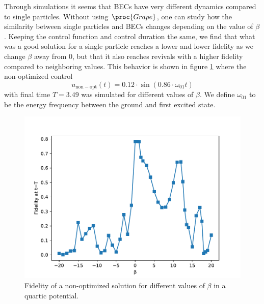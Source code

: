 \documentclass[a4paper, twocolumn]{revtex4-1}
\begin{document}
Through simulations it seems that BECs have very different dynamics compared to single particles. Without using $\proc{Grape}$, one can study how the similarity between single particles and BECs changes depending on the value of $\beta$. Keeping the control function and control duration the same, we find that what was a good solution for a single particle reaches a lower and lower fidelity as we change $\beta$ away from 0, but that it also reaches revivals with a higher fidelity compared to neighboring values. This behavior is shown in figure \ref{fig:beta} where the non-optimized control
\begin{equation}
	u_{\mathrm{non-opt}}(t)=0.12\cdot\sin(0.86\cdot \omega_{01} t)
	\label{eq:nonopt-control}
\end{equation} with final time $T=3.49$ was simulated for different values of $\beta$. We define $\omega_{01}$ to be the energy frequency between the ground and first excited state.

\begin{figure}[h]
	\includegraphics[width=\columnwidth]{graphics/exploration/nonOptBeta.pdf}
	\caption{Fidelity of a non-optimized solution for different values of $\beta$ in a quartic potential.}
	\label{fig:beta}
\end{figure}
\end{document}
